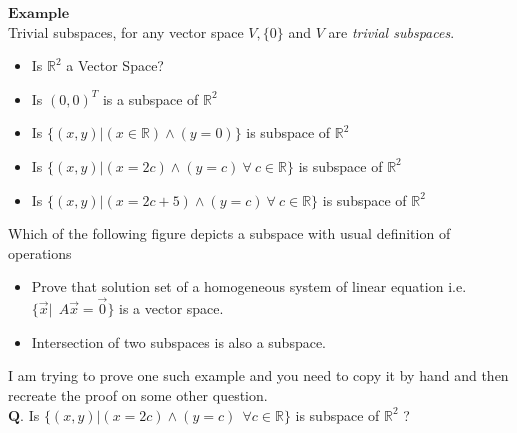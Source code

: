 \documentclass{article}
\begin{document}
$\boldsymbol{Example}$\\

Trivial subspaces, for any vector space $V, \{0\}$ and $V$ are \textit{trivial subspaces}.
\begin{itemize}
    \item Is $\mathbb{R}^2$ a Vector Space?
    \item Is $(0,0)^T$ is a subspace of $\mathbb{R}^2$
    \item Is \begin{math}\{(x,y) | (x \in \mathbb{R}) \wedge (y = 0)\}\end{math} is subspace of $\mathbb{R}^2$
    \item Is \begin{math}\{(x,y) | (x = 2c) \wedge (y = c) ~ \forall ~ c \in \mathbb{R}\}\end{math} is subspace of $\mathbb{R}^2$
    \item Is \begin{math}\{(x,y) | (x = 2c + 5) \wedge (y = c) ~ \forall ~ c \in \mathbb{R}\}\end{math} is subspace of $\mathbb{R}^2$
\end{itemize}
Which of the following figure depicts a subspace with usual definition of operations\\
\begin{itemize}
    \item Prove that solution set of a homogeneous system of linear equation i.e. $\{\vec{x}|~~A\vec{x} = \vec{0}\}$ is a vector space.
    \item Intersection of two subspaces is also a subspace.
\end{itemize}

I am trying to prove one such example and you need to copy it by hand and then recreate the proof on some other question.\\

$\boldsymbol{Q.}$ Is \begin{math} \{(x,y)|(x = 2c) \wedge (y=c)~~\forall c \in \mathbb{R}\}\end{math} is subspace of $\mathbb{R}^2$ ?\\

\end{document}
